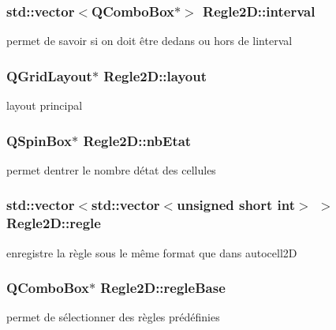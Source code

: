 \subsubsection[{\texorpdfstring{interval}{interval}}]{\setlength{\rightskip}{0pt plus 5cm}std\+::vector$<$Q\+Combo\+Box$\ast$$>$ Regle2\+D\+::interval\hspace{0.3cm}{\ttfamily [protected]}}\hypertarget{class_regle2_d_a528a7cfc33a1be6540177b67e270c157}{}\label{class_regle2_d_a528a7cfc33a1be6540177b67e270c157}
permet de savoir si on doit être dedans ou hors de l\textquotesingle{}interval 
\subsubsection[{\texorpdfstring{layout}{layout}}]{\setlength{\rightskip}{0pt plus 5cm}Q\+Grid\+Layout$\ast$ Regle2\+D\+::layout\hspace{0.3cm}{\ttfamily [protected]}}\hypertarget{class_regle2_d_a344f417a81ffccf34760808b3969d25e}{}\label{class_regle2_d_a344f417a81ffccf34760808b3969d25e}
layout principal 
\subsubsection[{\texorpdfstring{nb\+Etat}{nbEtat}}]{\setlength{\rightskip}{0pt plus 5cm}Q\+Spin\+Box$\ast$ Regle2\+D\+::nb\+Etat\hspace{0.3cm}{\ttfamily [protected]}}\hypertarget{class_regle2_d_a2a2964b8223ff47e483f0703c482526a}{}\label{class_regle2_d_a2a2964b8223ff47e483f0703c482526a}
permet d\textquotesingle{}entrer le nombre d\textquotesingle{}état des cellules 
\subsubsection[{\texorpdfstring{regle}{regle}}]{\setlength{\rightskip}{0pt plus 5cm}std\+::vector$<$std\+::vector$<$unsigned short int$>$ $>$ Regle2\+D\+::regle\hspace{0.3cm}{\ttfamily [protected]}}\hypertarget{class_regle2_d_adaa6396d86c6f21c6bf7ae5ba4346dde}{}\label{class_regle2_d_adaa6396d86c6f21c6bf7ae5ba4346dde}
enregistre la règle sous le même format que dans autocell2D 
\subsubsection[{\texorpdfstring{regle\+Base}{regleBase}}]{\setlength{\rightskip}{0pt plus 5cm}Q\+Combo\+Box$\ast$ Regle2\+D\+::regle\+Base\hspace{0.3cm}{\ttfamily [protected]}}\hypertarget{class_regle2_d_ae544919d03302b0ecd7bfacfc2842ccf}{}\label{class_regle2_d_ae544919d03302b0ecd7bfacfc2842ccf}
permet de sélectionner des règles prédéfinies 

